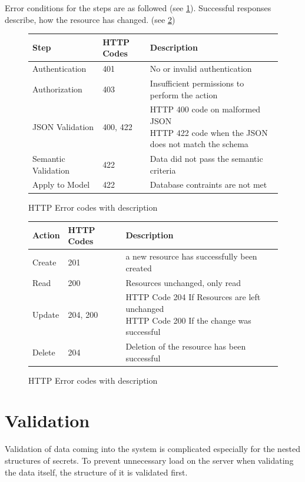 Error conditions for the steps are as followed (see \ref{tab:error_codes}).
Successful responses describe, how the resource has changed. (see
\ref{tab:success_codes})

\begin{figure}
  \begin{tabular}{|l|l|l|}
    \hline
    Step & HTTP Codes & Description \\ \hline
    Authentication & 401 & No or invalid authentication \\ \hline
    Authorization & 403 & Insufficient permissions to perform the action \\ \hline
    JSON Validation & 400, 422 & \parbox[t]{10cm}{HTTP 400 code on malformed JSON\\HTTP 422 code when the JSON does not match the schema} \\ \hline
    Semantic Validation & 422 & Data did not pass the semantic criteria \\ \hline
    Apply to Model & 422 & Database contraints are not met \\ \hline
  \end{tabular}
  \caption{HTTP Error codes with description}
  \centering
  \label{tab:error_codes}
\end{figure}

\begin{figure}
  \begin{tabular}{|l|l|l|}
    \hline
    Action & HTTP Codes & Description \\ \hline
    Create & 201 & a new resource has successfully been created \\ \hline
    Read & 200 & Resources unchanged, only read \\ \hline
    Update & 204, 200 & \parbox[t]{9cm}{HTTP Code 204 If Resources are left unchanged\\ HTTP Code 200 If the change was successful} \\ \hline
    Delete & 204 & Deletion of the resource has been successful \\ \hline
  \end{tabular}
  \caption{HTTP Error codes with description}
  \centering
  \label{tab:success_codes}
\end{figure}

\section{Validation}

Validation of data coming into the system is complicated especially for the
nested structures of secrets. To prevent unnecessary load on the server when
validating the data itself, the structure of it is validated first.

